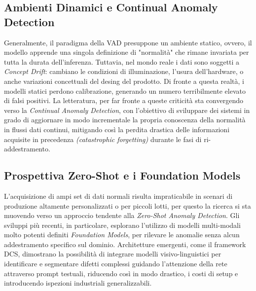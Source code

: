 \subsection{Ambienti Dinamici e Continual Anomaly Detection}
Generalmente, il paradigma della VAD presuppone un ambiente statico, ovvero, il modello apprende una singola definizione di "normalità" che rimane invariata per tutta la durata dell'inferenza. Tuttavia, nel mondo reale i dati sono soggetti a \textit{Concept Drift}: cambiano le condizioni di illuminazione, l'usura dell'hardware, o anche variazioni concettuali del desing del prodotto.
Di fronte a questa realtà, i modelli statici perdono calibrazione, generando un numero terribilmente elevato di falsi positivi.\cite{Faber_et_al._2026} 
La letteratura, per far fronte a queste criticità sta convergendo verso la \textit{Continual Anomaly Detection}, con l'obiettivo di sviluppare dei sistemi in grado di aggiornare in modo incrementale la propria conoscenza della normalità in flussi dati continui, mitigando così la perdita drastica delle informazioni acquisite in precedenza \textit{(catastrophic forgetting)} durante le fasi di ri-addestramento.\cite{Faber_et_al._2026}

\subsection{Prospettiva Zero-Shot e i Foundation Models}
L'acquisizione di ampi set di dati normali risulta impraticabile in scenari di produzione altamente personalizzati o per piccoli lotti, per questo la ricerca si sta muovendo verso un approccio tendente alla \textit{Zero-Shot Anomaly Detection}.
Gli sviluppi più recenti, in particolare, esplorano l'utilizzo di modelli multi-modali molto potenti definiti \textit{Foundation Models}, per rilevare le anomalie senza alcun addestramento specifico sul dominio.\cite{Wan_et_al._2026} 
Architetture emergenti, come il framework DCS, dimostrano la possibilità di integrare modelli visivo-linguistici per identificare e segmentare difetti complessi guidando l'attenzione della rete attraverso prompt testuali, riducendo così in modo drastico, i costi di setup e introducendo ispezioni industriali generalizzabili.\cite{Wan_et_al._2026}
